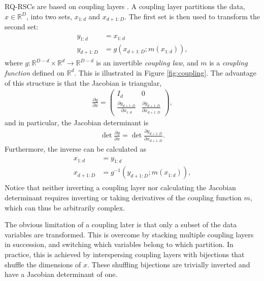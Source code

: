 \documentclass[twocolumn]{aastex631}
\newcommand{\R}{\mathbb{R}}
\begin{document}
RQ-RSCs are based on coupling layers \citep{dinh2015, dinh2017}.
A coupling layer partitions the data, $x \in \R^D$, into two sets, $x_{1:d}$ and $x_{d+1:D}$.
The first set is then used to transform the second set:
\begin{align}
    \begin{split}
    y^{}_{1:d} &= x^{}_{1:d} \\
    y^{}_{d+1:D} &= g(x^{}_{d+1:D}; m(x^{}_{1:d})),
    \end{split}
\end{align}
where $g : \R^{D-d} \times \R^d \to \R^{D-d}$ is an invertible \emph{coupling law}, and $m$ is a \emph{coupling function} defined on $\R^d$.
This is illustrated in Figure \ref{fig:coupling}.
The advantage of this structure is that the Jacobian is triangular,
\begin{align}
    \frac{\partial y}{\partial x} =
    \begin{pmatrix}
         I_d & 0 \\
         \frac{\partial y^{}_{d+1:D}}{\partial x^{}_{1:d}}
         & \frac{\partial y^{}_{d+1:D}}{\partial x^{}_{d+1:D}}
    \end{pmatrix},
\end{align}
and in particular, the Jacobian determinant is
\begin{align}
    \det \frac{\partial y}{\partial x} = \det \frac{\partial y^{}_{d+1:D}}{\partial x^{}_{d+1:D}}.
\end{align}
Furthermore, the inverse can be calculated as
\begin{align}
    \begin{split}
    x^{}_{1:d} &= y^{}_{1:d} \\
    x^{}_{d+1:D} &= g^{-1}(y^{}_{d+1:D}; m(x^{}_{1:d})),
    \end{split}
\end{align}
Notice that neither inverting a coupling layer nor calculating the Jacobian determinant requires inverting or taking derivatives of the coupling function $m$, which can thus be arbitrarily complex.

The obvious limitation of a coupling later is that only a subset of the data variables are transformed.
This is overcome by stacking multiple coupling layers in succession, and switching which variables belong to which partition.
In practice, this is achieved by interspersing coupling layers with bijections that shuffle the dimensions of $x$.
These shuffling bijections are trivially inverted and have a Jacobian determinant of one.
\end{document}
